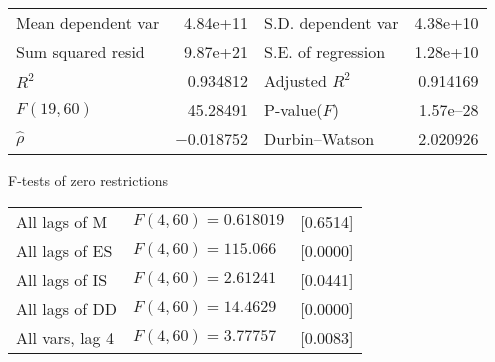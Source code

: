 \documentclass[11pt]{article}
\begin{document}
\begin{center}
\vspace{1ex}
\begin{tabular}{lrlr}
Mean dependent var &  4.84\textrm{e+11} & S.D. dependent var &  4.38\textrm{e+10} \\
Sum squared resid &  9.87\textrm{e+21} & S.E. of regression &  1.28\textrm{e+10} \\
$R^2$ &  0.934812 & Adjusted $R^2$ &  0.914169 \\
$F(19, 60)$ &  45.28491 & P-value($F$) &  1.57\textrm{e--28} \\
$\hat{\rho}$ & $-$0.018752 & Durbin--Watson &  2.020926 \\
\end{tabular}


\end{center}

\begin{center}
F-tests of zero restrictions\\[1em]
\begin{tabular}{lll}
All lags of M & $F(4, 60) = 0.618019$ & [0.6514]\\
All lags of ES & $F(4, 60) = 115.066$ & [0.0000]\\
All lags of IS & $F(4, 60) = 2.61241$ & [0.0441]\\
All lags of DD & $F(4, 60) = 14.4629$ & [0.0000]\\
All vars, lag 4 & $F(4, 60) = 3.77757$ & [0.0083]\\
\end{tabular}
\end{center}

\clearpage
\end{document}
